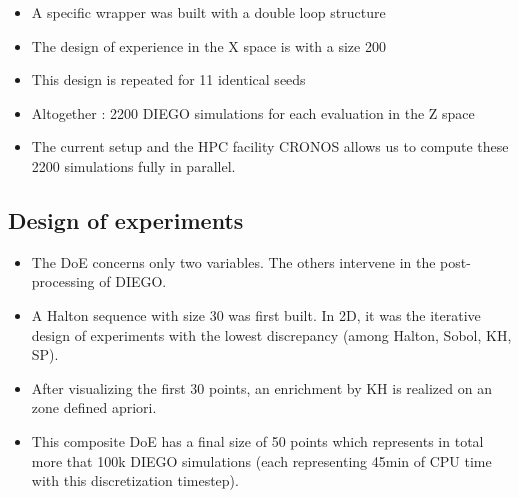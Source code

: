 \begin{itemize}
    \item A specific wrapper was built with a double loop structure
    \item The design of experience in the X space is with a size 200
    \item This design is repeated for 11 identical seeds
    \item Altogether : 2200 DIEGO simulations for each evaluation in the Z space
    \item The current setup and the HPC facility CRONOS allows us to compute these 2200 simulations fully in parallel.
\end{itemize}

\subsection{Design of experiments}

\begin{itemize}
    \item The DoE concerns only two variables. The others intervene in the post-processing of DIEGO. 
    \item A Halton sequence with size 30 was first built. In 2D, it was the iterative design of experiments with the lowest discrepancy (among Halton, Sobol, KH, SP).
    \item After visualizing the first 30 points, an enrichment by KH is realized on an zone defined apriori.  
    \item This composite DoE has a final size of 50 points which represents in total more that 100k DIEGO simulations (each representing 45min of CPU time with this discretization timestep).
\end{itemize}

